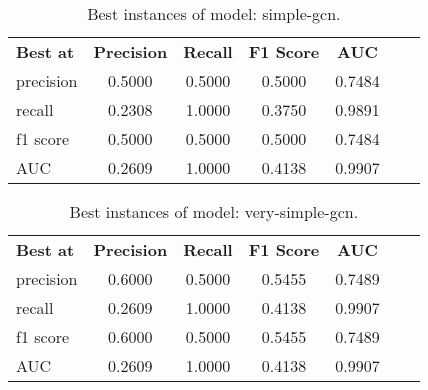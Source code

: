     \begin{table}[ht]
        \centering
        \caption{Best instances of model: simple-gcn.}
        \begin{tabular}{lcccccc}
          \textbf{Best at}  & \textbf{Precision} & \textbf{Recall} & \textbf{F1 Score} & \textbf{AUC} \\
            precision & 0.5000 & 0.5000 & 0.5000 & 0.7484 \\
            recall & 0.2308 & 1.0000 & 0.3750 & 0.9891 \\
            f1 score & 0.5000 & 0.5000 & 0.5000 & 0.7484 \\
            AUC & 0.2609 & 1.0000 & 0.4138 & 0.9907 \\
        \end{tabular}
    \end{table}


    \begin{table}[ht]
        \centering
        \caption{Best instances of model: very-simple-gcn.}
        \begin{tabular}{lcccccc}
          \textbf{Best at}  & \textbf{Precision} & \textbf{Recall} & \textbf{F1 Score} & \textbf{AUC} \\
            precision & 0.6000 & 0.5000 & 0.5455 & 0.7489 \\
            recall & 0.2609 & 1.0000 & 0.4138 & 0.9907 \\
            f1 score & 0.6000 & 0.5000 & 0.5455 & 0.7489 \\
            AUC & 0.2609 & 1.0000 & 0.4138 & 0.9907 \\
        \end{tabular}
    \end{table}
